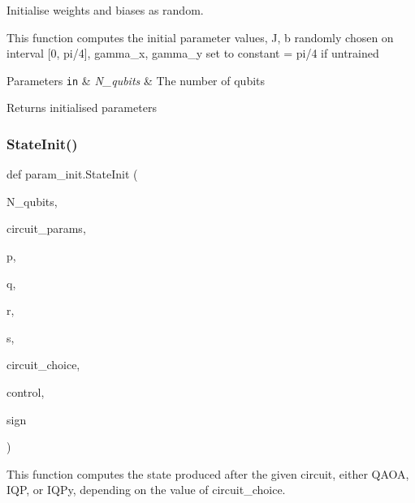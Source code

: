 Initialise weights and biases as random. 

This function computes the initial parameter values, J, b randomly chosen on interval \mbox{[}0, pi/4\mbox{]}, gamma\+\_\+x, gamma\+\_\+y set to constant = pi/4 if untrained


\begin{DoxyParams}[1]{Parameters}
\mbox{\tt in}  & {\em N\+\_\+qubits} & The number of qubits\\
\hline
\end{DoxyParams}
\begin{DoxyReturn}{Returns}
initialised parameters 
\end{DoxyReturn}
\mbox{\label{namespaceparam__init_acaba8c3dc08d2083e7277f86f4ff232c}} 
\subsubsection{\texorpdfstring{State\+Init()}{StateInit()}}
{\footnotesize\ttfamily def param\+\_\+init.\+State\+Init (\begin{DoxyParamCaption}\item[{}]{N\+\_\+qubits,  }\item[{}]{circuit\+\_\+params,  }\item[{}]{p,  }\item[{}]{q,  }\item[{}]{r,  }\item[{}]{s,  }\item[{}]{circuit\+\_\+choice,  }\item[{}]{control,  }\item[{}]{sign }\end{DoxyParamCaption})}

\begin{DoxyVerb}This function computes the state produced after the given circuit, either QAOA, IQP, or IQPy,
depending on the value of circuit_choice.\end{DoxyVerb}
 